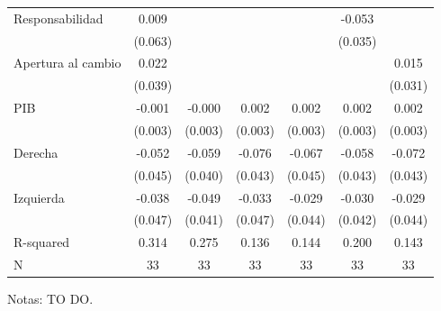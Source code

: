 \begin{table}[h]
{{\begin{threeparttable}
\begin{tabular}{l*{6}{S}}
						Responsabilidad     &       0.009         &                     &                     &                     &      -0.053         &                     \\
						&     (0.063)         &                     &                     &                     &     (0.035)         &                     \\
						Apertura al cambio  &       0.022         &                     &                     &                     &                     &       0.015         \\
						&     (0.039)         &                     &                     &                     &                     &     (0.031)         \\
						PIB                 &      -0.001         &      -0.000         &       0.002         &       0.002         &       0.002         &       0.002         \\
						&     (0.003)         &     (0.003)         &     (0.003)         &     (0.003)         &     (0.003)         &     (0.003)         \\
						Derecha             &      -0.052         &      -0.059         &      -0.076\sym{*}  &      -0.067         &      -0.058         &      -0.072         \\
						&     (0.045)         &     (0.040)         &     (0.043)         &     (0.045)         &     (0.043)         &     (0.043)         \\
						Izquierda           &      -0.038         &      -0.049         &      -0.033         &      -0.029         &      -0.030         &      -0.029         \\
						&     (0.047)         &     (0.041)         &     (0.047)         &     (0.044)         &     (0.042)         &     (0.044)         \\
						\midrule
						R-squared           &       0.314         &       0.275         &       0.136         &       0.144         &       0.200         &       0.143         \\
						N                   &          33         &          33         &          33         &          33         &          33         &          33         \\
						\hline\hline
					\end{tabular}
					\begin{tablenotes}
						\footnotesize{Notas: TO DO.}
					\end{tablenotes}
				\end{threeparttable}
			}
		}
	\end{table}
	
